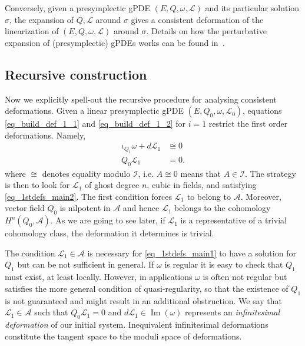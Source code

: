 \documentclass[a4paper,12pt]{article}
\numberwithin{equation}{section} %
\renewcommand{\simeq}{\cong}
\newcommand{\im}{\mathop{\mathrm{Im}}}
\newcommand{\algA}{\mathcal{A}}
\def\cI{\mathcal{I}}
\def\cL{\mathcal{L}}
\newcommand{\h}{\cL}
\begin{document}
Conversely, given a presymplectic gPDE $(E,Q,\omega,\h)$ and its particular solution $\sigma$, the expansion of $Q,\cL$ around $\sigma$ gives a consistent deformation of the linearization of $(E,Q,\omega,\h)$ around $\sigma$. Details on how the perturbative expansion of (presymplectic) gPDEs works can be found in~\cite{Grigoriev:2024ncm}.


\subsection{Recursive  construction }
Now we explicitly spell-out the recursive procedure for analysing consistent deformations. Given a linear presymplectic gPDE $(E,Q_0,\omega,\h_0)$, equations \eqref{eq_build_def_1_1} and \eqref{eq_build_def_1_2} for $i=1$ restrict the first order deformations. Namely, 
\begin{align}
	\iota_{Q_1}\omega + d \h_1 &\simeq 0 \label{eq_1stdefs_main1} \\
	Q_0\h_1 &= 0. \label{eq_1stdefs_main2}
\end{align}
where $\simeq$ denotes equality modulo $\cI$, i.e. $A\simeq 0$ means that $A\in \cI$.
The strategy is then to look for $\cL_1$ of ghost degree $n$, cubic in fields, and  satisfying \eqref{eq_1stdefs_main2}. The first condition forces $\cL_1$ to belong to $\algA$. Moreover, vector field $Q_0$ is nilpotent in $\algA$  and hence $\cL_1$ belongs to the cohomology $H^n(Q_0,\mathcal{A})$. As we are going to see later, if $\cL_1$ is a  representative of a trivial cohomology class, the deformation it determines is trivial.

The condition $\cL_1 \in \algA$ is necessary for \eqref{eq_1stdefs_main1} to have a solution for $Q_1$ but can be not sufficient in general. If $\omega$ is regular it is easy to check that $Q_1$ must exist, at least locally. However, in applications $\omega$ is often not regular but satisfies the more general condition of quasi-regularity, so that the existence of $Q_1$ is not guaranteed and might result in an additional obstruction. We say that $\cL_1 \in \algA$ such that $Q_0\cL_1=0$ and $d\cL_1 \in \im(\omega)$ represents an \textit{infinitesimal deformation} of our initial system. Inequivalent infinitesimal deformations constitute the tangent space to the moduli space of deformations.
\end{document}
